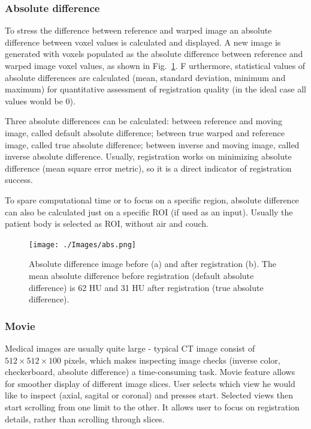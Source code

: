 \documentclass[type=dr, dr=rernat, accentcolor=tud7b,colorbacktitle, bigchapter, openright, twoside, 12pt ]{tudthesis}
\begin{document}
\subsubsection{Absolute difference}
\label{sec:absDiff}

To stress the difference between reference and warped image an absolute difference between voxel values is calculated and displayed. 
A new image is generated with voxels populated as the absolute difference between reference and warped image voxel values, as shown in Fig.~\ref{absDiff}. F
urthermore, statistical values of absolute differences are calculated (mean, standard deviation, minimum and maximum) 
for quantitative assessment of registration quality (in the ideal case all values would be 0).

Three absolute differences can be calculated: between reference and moving image, called default absolute difference; between true warped and reference image, called true absolute difference; between inverse and moving image, called
inverse absolute difference. Usually, registration works on minimizing absolute difference (mean square error metric), so it is a direct indicator
of registration success.

To spare computational time or to focus on a specific region, absolute difference can also be calculated just on a specific ROI (if used as an input). Usually the patient body is selected as ROI, without air and couch.


\begin{figure}[H]
	\begin{center}		
		\texttt{[image: ./Images/abs.png]}
		\caption{Absolute difference image before (a) and after registration (b). The mean absolute difference before registration (default absolute difference) is 62 HU and 31 HU after registration (true absolute difference).}
		\label{absDiff}
	\end{center}
\end{figure}

\subsubsection{Movie}

Medical images are usually quite large - typical CT image consist of $512 \times 512 \times 100$ pixels, which makes inspecting image checks (inverse color, checkerboard, absolute difference) a time-consuming task. Movie feature allows for smoother display of different image slices. User selects which view he would like to inspect (axial, sagital or coronal) and presses start. Selected views then start scrolling from one limit to the other. It allows user to focus on registration details, rather than scrolling through slices.
\end{document}
